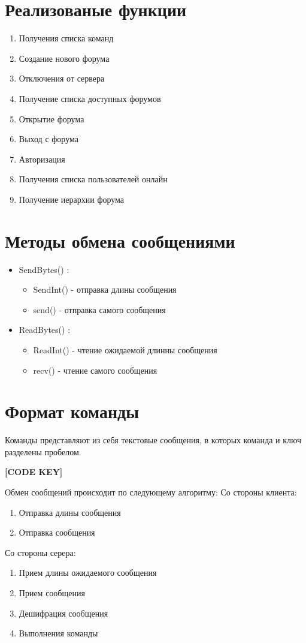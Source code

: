 \documentclass[a4paper,12pt]{extarticle}
\begin{document}
\section{Реализованые функции}
\begin{enumerate}
\item Получения списка команд 		
\item Создание нового форума 			 
\item Отключения от сервера 			
\item Получение списка доступных форумов
\item Открытие форума 				
\item Выход с форума
\item Авторизация 		
\item Получения списка пользователей онлайн
\item Получение иерархии форума		
\end{enumerate}

\section{Методы обмена сообщениями}
\begin{itemize}
\item SendBytes() :
\begin{itemize}
\item SendInt() - отправка длины сообщения
\item send() - отправка самого сообщения
\end{itemize}
\item ReadBytes() :
\begin{itemize}
\item ReadInt() - чтение ожидаемой длинны сообщения
\item recv() - чтение самого сообщения
\end{itemize}
\end{itemize}
\section{Формат команды}
Команды представляют из себя текстовые сообщения, в которых команда и ключ разделены пробелом.
\begin{center}\large\textbf{[CODE KEY]}\end{center}
Обмен сообщений происходит по следующему алгоритму:
\newline
Со стороны клиента:
\begin{enumerate}
\item Отправка длины сообщения
\item Отправка сообщения
\end{enumerate}
Со стороны серера:
\begin{enumerate}
\item Прием длины ожидаемого сообщения
\item Прием сообщения
\item Дешифрация сообщения
\item Выполнения команды
\end{enumerate}
\end{document}
